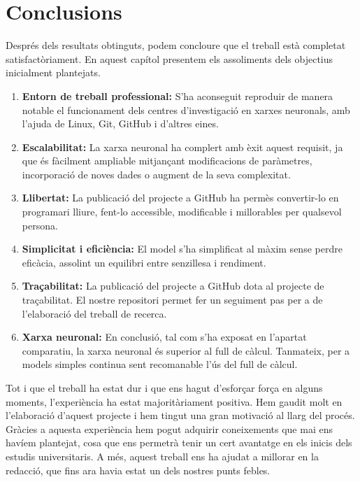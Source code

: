 \chapter{Conclusions}

\label{c:conclusions}

Després dels resultats obtinguts, podem concloure que el treball està completat satisfactòriament. En aquest capítol presentem els assoliments dels objectius inicialment plantejats.

\begin{enumerate}

     \item \textbf{Entorn de treball professional: } S’ha aconseguit reproduir de manera notable el funcionament dels centres d’investigació en xarxes neuronals, amb l'ajuda de Linux, Git, GitHub i d'altres eines.

     \item \textbf{Escalabilitat: } La xarxa neuronal ha complert amb èxit aquest requisit, ja que és fàcilment ampliable mitjançant modificacions de paràmetres, incorporació de noves dades o augment de la seva complexitat.

     \item \textbf{Llibertat: } La publicació del projecte a GitHub ha permès convertir-lo en programari lliure, fent-lo accessible, modificable i millorables per qualsevol persona.

     \item \textbf{Simplicitat i eficiència: } El model s’ha simplificat al màxim sense perdre eficàcia, assolint un equilibri entre senzillesa i rendiment.

     \item \textbf{Traçabilitat: } La publicació del projecte a GitHub dota al projecte de traçabilitat. El nostre repositori permet fer un seguiment pas per a de l'elaboració del treball de recerca.

     \item \textbf{Xarxa neuronal: } En conclusió, tal com s’ha exposat en l’apartat comparatiu, la xarxa neuronal és superior al full de càlcul. Tanmateix, per a models simples continua sent recomanable l’ús del full de càlcul.

\end{enumerate}

Tot i que el treball ha estat dur i que ens hagut d'esforçar força en alguns moments, l’experiència ha estat majoritàriament positiva. Hem gaudit molt en l’elaboració d’aquest projecte i hem tingut una gran motivació al llarg del procés. Gràcies a aquesta experiència hem pogut adquirir coneixements que mai ens havíem plantejat, cosa que ens permetrà tenir un cert avantatge en els inicis dels estudis universitaris. A més, aquest treball ens ha ajudat a millorar en la redacció, que fins ara havia estat un dels nostres punts febles.

